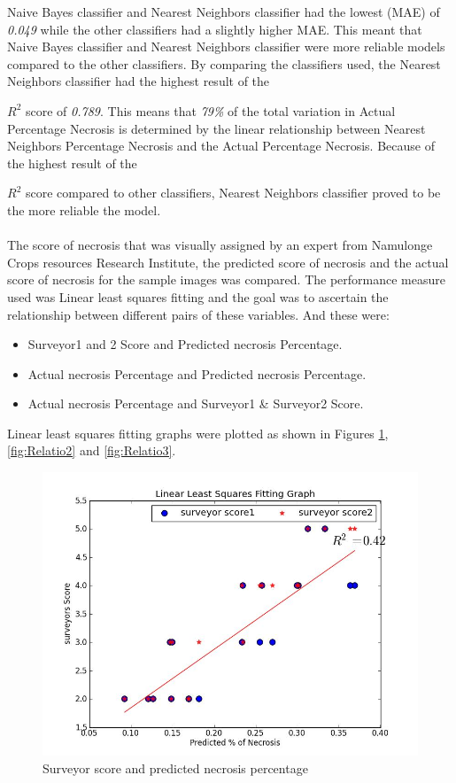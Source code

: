 \documentclass[conference]{IEEEtran}
\begin{document}
\noindent Naive Bayes classifier and Nearest Neighbors classifier had the lowest (MAE) of \emph{0.049} while the other classifiers had a slightly higher MAE. This meant that Naive Bayes classifier and Nearest Neighbors classifier were more reliable models compared to the other classifiers. By comparing the classifiers used, the Nearest Neighbors classifier had the highest result of the {$R^{2}$ score of \emph{0.789}. This means that \emph{79\% }of the total variation in Actual Percentage Necrosis is determined by the linear relationship between Nearest Neighbors Percentage Necrosis and the Actual Percentage Necrosis. Because of the highest result of the {$R^{2}$ score compared to other classifiers, Nearest Neighbors classifier proved to be the more reliable the model.\\ \\The score of necrosis that was visually assigned by an expert from Namulonge Crops resources Research Institute, the predicted score of necrosis and the actual score of necrosis for the sample images was compared. The performance measure used was Linear least squares fitting and the goal was to ascertain the relationship between different pairs of these variables. And these were:
\begin{itemize}
  \item Surveyor1 and 2 Score and Predicted necrosis Percentage.
  \item Actual necrosis Percentage and Predicted necrosis Percentage.
  \item Actual necrosis Percentage and Surveyor1 \& Surveyor2 Score.
\end{itemize}



Linear least squares fitting graphs were plotted as shown in Figures \ref{fig:Relatio1}, \ref{fig:Relatio2} and \ref{fig:Relatio3}.

\begin{figure}[t!]
\centering
\includegraphics[scale=0.25]{images/Suveyor_predicted.jpg}
\caption{Surveyor score and predicted necrosis percentage}
\label{fig:Relatio1}
\end{figure}

}}
\end{document}
